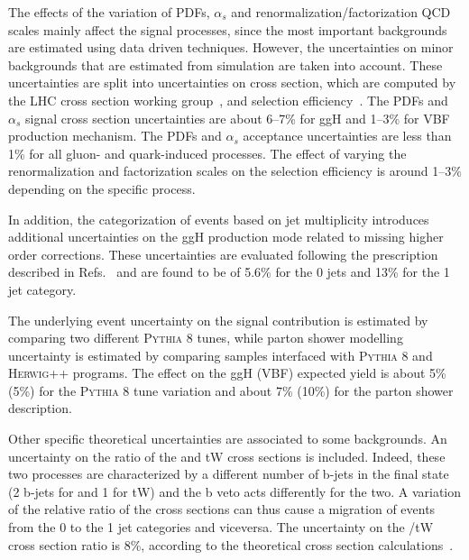 The effects of the variation of PDFs, $\alpha_s$ and renormalization/factorization QCD scales mainly affect the signal processes, since the most important backgrounds are estimated using data driven techniques. However, the uncertainties on minor backgrounds that are estimated from simulation are taken into account. These uncertainties are split into uncertainties on cross section, which are computed by the LHC cross section working group~\cite{YRtmp}, and selection efficiency~\cite{Butterworth:2015oua}. The PDFs and $\alpha_{s}$ signal cross section  uncertainties are about 6--7\% for ggH and 1--3\% for VBF production mechanism. The PDFs and $\alpha_{s}$ acceptance uncertainties are less than 1\% for all gluon- and quark-induced processes. The effect of varying the renormalization and factorization scales on the selection efficiency is around 1--3\% depending on the specific process. 

In addition, the categorization of events based on jet multiplicity introduces additional uncertainties on the ggH production mode related to missing higher order corrections. These uncertainties are evaluated following the prescription described in Refs.~\cite{Stewart:2011cf,Heinemeyer:2013tqa} and are found to be of 5.6\% for the 0 jets and 13\% for the 1 jet category.

The underlying event uncertainty on the signal contribution is estimated by comparing two different \textsc{Pythia 8} tunes, while parton shower modelling uncertainty is estimated by comparing samples interfaced with \textsc{Pythia 8} and \textsc{Herwig++} programs. 
The effect on the ggH (VBF) expected yield is about 5\% (5\%) for the \textsc{Pythia 8} tune variation and about 7\% (10\%) for the parton shower description.

Other specific theoretical uncertainties are associated to some backgrounds. An uncertainty on the ratio of the \ttbar and tW cross sections is included. Indeed, these two processes are characterized by a different number of b-jets in the final state (2 b-jets for \ttbar and 1 for tW) and the b veto acts differently for the two. A variation of the relative ratio of the cross sections can thus cause a migration of events from the 0 to the 1 jet categories and viceversa. The uncertainty on the \ttbar/tW cross section ratio is 8\%, according to the theoretical cross section calculations~\cite{topxsec,singletop}.

